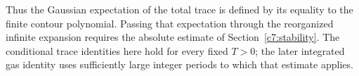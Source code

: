 Thus the Gaussian expectation of the total trace is defined by its equality to the finite contour polynomial. Passing that expectation through the reorganized infinite expansion requires the absolute estimate of Section~\ref{c7:stability}. The conditional trace identities here hold for every fixed $T>0$; the later integrated gas identity uses sufficiently large integer periods to which that estimate applies.
